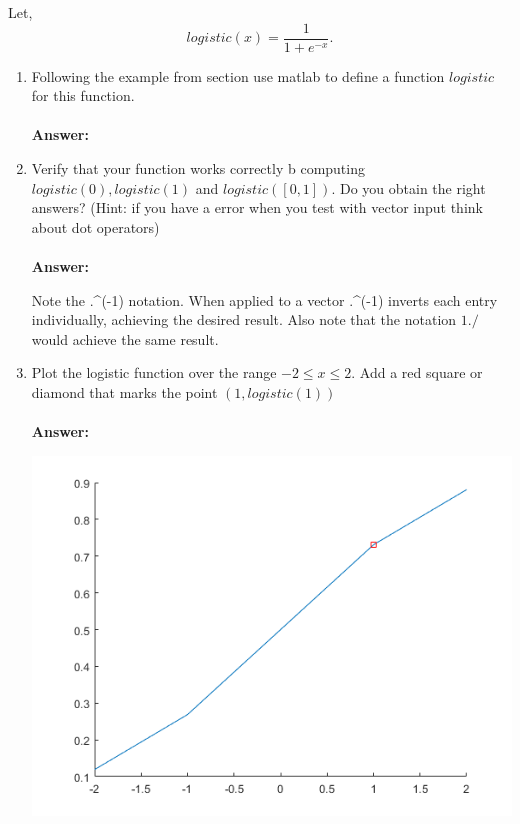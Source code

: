 \documentclass[12pt]{article}
\makeatletter
\theoremstyle{homework}
\newenvironment{exercise}[1]
{\def\@currentlabel{#1}\exercisecore}
{\endexercisecore}
\makeatother
\begin{document}
\begin{exercise}{9} Let,
  \begin{equation*}
    logistic(x) = \frac{1}{1+e^{-x}}.
  \end{equation*}

  \begin{enumerate}
    \item Following the example from section use matlab to define a function $logistic$ for this function.\\\\
    \textbf{Answer:}
    

    
    \item Verify that your function works correctly b computing $logistic(0), logistic(1)$ and $logistic([0,1])$. Do you obtain the right answers? (Hint: if you have a error when you test with vector input think about dot operators)\\\\
    \textbf{Answer:}
    
    Note the .\string^(-1) notation. When applied to a vector .\string^(-1) inverts each entry individually, achieving the desired result. Also note that the notation $1./$ would achieve the same result.

    \item Plot the logistic function over the range $-2 \leq x \leq 2$. Add a red square or diamond that marks the point $(1, logistic(1))$ \\\\
    \textbf{Answer:}
    
    \includegraphics[width=\textwidth]{ex9.png}
  \end{enumerate}
  



\end{exercise}
\end{document}
